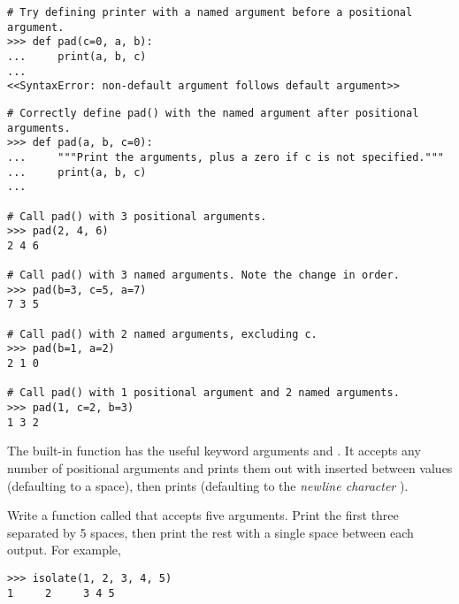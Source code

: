 \begin{lstlisting}
# Try defining printer with a named argument before a positional argument.
>>> def pad(c=0, a, b):
...     print(a, b, c)
...
<<SyntaxError: non-default argument follows default argument>>
\end{lstlisting} %
\begin{lstlisting}
# Correctly define pad() with the named argument after positional arguments.
>>> def pad(a, b, c=0):
...     """Print the arguments, plus a zero if c is not specified."""
...     print(a, b, c)
...

# Call pad() with 3 positional arguments.
>>> pad(2, 4, 6)
2 4 6

# Call pad() with 3 named arguments. Note the change in order.
>>> pad(b=3, c=5, a=7)
7 3 5

# Call pad() with 2 named arguments, excluding c.
>>> pad(b=1, a=2)
2 1 0

# Call pad() with 1 positional argument and 2 named arguments.
>>> pad(1, c=2, b=3)
1 3 2
\end{lstlisting}

\begin{problem}
The built-in  function has the useful keyword arguments  and .
It accepts any number of positional arguments and prints them out with  inserted between values (defaulting to a space), then prints  (defaulting to the \emph{newline character} ).

Write a function called  that accepts five arguments.
Print the first three separated by 5 spaces, then print the rest with a single space between each output.
For example,
\begin{lstlisting}
>>> isolate(1, 2, 3, 4, 5)
1     2     3 4 5
\end{lstlisting}
\end{problem}

\begin{comment}
\begin{warn} %
In previous versions of Python, \li{print()} was a \emph{statement} (like \li{return}), not a function, and could therefore be executed without parentheses.
However, it lacked keyword arguments like \li{sep} and \li{end}.
\begin{lstlisting}
>>> from __future__ import print_function
\end{lstlisting}
\end{warn}
\end{comment}

